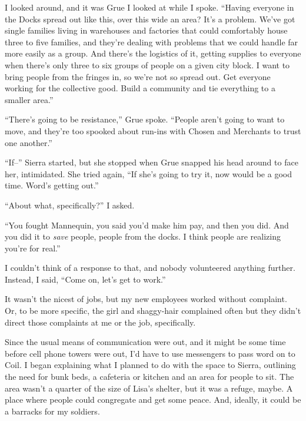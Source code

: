 I looked around, and it was Grue I looked at while I spoke.  ``Having everyone in the Docks spread out like this, over this wide an area?  It's a problem.  We've got single families living in warehouses and factories that could comfortably house three to five families, and they're dealing with problems that we could handle far more easily as a group.  And there's the logistics of it, getting supplies to everyone when there's only three to six groups of people on a given city block.  I want to bring people from the fringes in, so we're not so spread out.  Get everyone working for the collective good.  Build a community and tie everything to a smaller area.''



``There's going to be resistance,'' Grue spoke.  ``People aren't going to want to move, and they're too spooked about run-ins with Chosen and Merchants to trust one another.''



``If--'' Sierra started, but she stopped when Grue snapped his head around to face her, intimidated.  She tried again, ``If she's going to try it, now would be a good time.  Word's getting out.''



``About what, specifically?'' I asked.



``You fought Mannequin, you said you'd make him pay, and then you did.  And you did it to \emph{save }people, people from the docks.  I think people are realizing you're for real.''



I couldn't think of a response to that, and nobody volunteered anything further.  Instead, I said, ``Come on, let's get to work.''



It wasn't the nicest of jobs, but my new employees worked without complaint.  Or, to be more specific, the girl and shaggy-hair complained often but they didn't direct those complaints at me or the job, specifically.



Since the usual means of communication were out, and it might be some time before cell phone towers were out, I'd have to use messengers to pass word on to Coil.  I began explaining what I planned to do with the space to Sierra, outlining the need for bunk beds, a cafeteria or kitchen and an area for people to sit.  The area wasn't a quarter of the size of Lisa's shelter, but it was a refuge, maybe.  A place where people could congregate and get some peace.  And, ideally, it could be a barracks for my soldiers.



